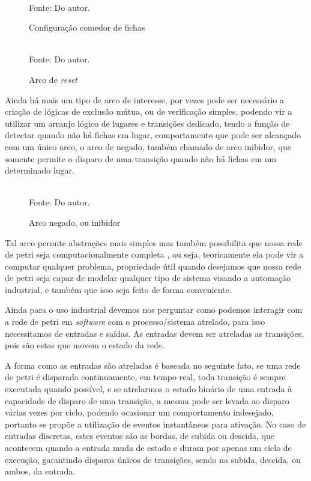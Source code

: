 \begin{figure}[ht]
	\centering
	\caption{Configuração comedor de fichas}
	\\
	\label{fig:comedor}
	\footnotesize{Fonte: Do autor.}
\end{figure}

\begin{figure}[ht]
	\centering
	\caption{Arco de \textit{reset}}
	\\
	\label{fig:reset}
	\footnotesize{Fonte: Do autor.}
\end{figure}

Ainda há mais um tipo de arco de interesse, por vezes pode ser necessário a criação de lógicas de exclusão mútua, ou de verificação simples, podendo vir a utilizar um arranjo lógico de lugares e transições dedicado, tendo a função de detectar quando não há fichas em lugar, comportamento que pode ser alcançado com um único arco, o arco de negado, também chamado de arco inibidor, que somente permite o disparo de uma transição quando não há fichas em um determinado lugar.

\begin{figure}[ht]
	\centering
	\caption{Arco negado, ou inibidor}
	\\
	\label{fig:negado}
	\footnotesize{Fonte: Do autor.}
\end{figure}

Tal arco permite abstrações mais simples mas também possibilita que nossa rede de petri seja computacionalmente completa \cite{petrinetTuringComplete}, ou seja, teoricamente ela pode vir a computar qualquer problema, propriedade útil quando desejamos que nossa rede de petri seja capaz de modelar qualquer tipo de sistema visando a automação industrial, e também que isso seja feito de forma conveniente.  

Ainda para o uso industrial devemos nos perguntar como podemos interagir com a rede de petri em \textit{software} com o processo/sistema atrelado, para isso necessitamos de entradas e saídas. As entradas devem ser atreladas as transições, pois são estas que movem o estado da rede.

A forma como as entradas são atreladas é baseada no seguinte fato, se uma rede de petri é disparada continuamente, em tempo real, toda transição é sempre executada quando possível, e se atrelarmos o estado binário de uma entrada à capacidade de disparo de uma transição, a mesma pode ser levada ao disparo várias vezes por ciclo, podendo ocasionar um comportamento indesejado, portanto se propõe a utilização de eventos instantâneos para ativação. No caso de entradas discretas, estes eventos são as bordas, de subida ou descida, que acontecem quando a entrada muda de estado e duram por apenas um ciclo de execução, garantindo disparos únicos de transições, sendo na subida, descida, ou ambos, da entrada.

